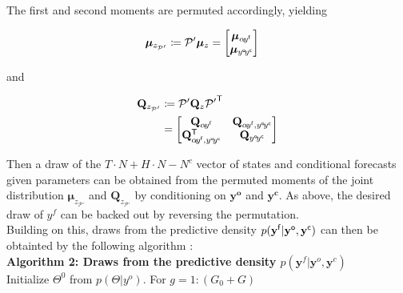 \documentclass[notitlepage,a4paper,12pt]{article}
\newcommand{\transpose}[1]{{#1}^{\sf{T}}}
\begin{document}
The first and second moments are permuted accordingly, yielding 

\begin{align*}
\boldsymbol{\mu}_{z_{\mathcal{P}'}} &\coloneqq \mathcal{P}' \boldsymbol{\mu}_z = 
\begin{bmatrix}
    \boldsymbol{\mu}_{\alpha\! y^{\sf{f}}} \\
    \boldsymbol{\mu}_{y^{\sf{o}}\!y^{\sf{c}}}
\end{bmatrix}
\end{align*}

and 

\begin{align*}
    \mathbf{Q}_{z_{\mathcal{P}'}} &\coloneqq  \mathcal{P}' \mathbf{Q}_z \transpose{\mathcal{P}'} \\
    &= 
    \begin{bmatrix}
        \mathbf{Q}_{\alpha\! y^{\sf{f}}} & \mathbf{Q}_{\alpha\! y^{\sf{f}}, y^{\sf{o}}\!y^{\sf{c}}} \\ 
        \mathbf{Q}^{\sf{T}}_{\alpha\! y^{\sf{f}}, y^{\sf{o}}\! y^{\sf{c}}} & \mathbf{Q}_{y^{\sf{o}}\!y^{\sf{c}}}
    \end{bmatrix}
\end{align*}

Then a draw of the $T\!\cdot\!N + H\!\cdot\!N - N^c$ vector of states and conditional forecasts given parameters can be obtained from the permuted moments of the joint distribution $\boldsymbol{\mu}_{z_{\mathcal{P}'}} $ and $\mathbf{Q}_{z_{\mathcal{P}'}} $ by conditioning on $\mathbf{y^{o}}$ and $\mathbf{y^c}$. As above, the desired draw of $y^f$ can be backed out by reversing the permutation.\\

Building on this, draws from the predictive density $p(\mathbf{y^{\sf{f}}}|\mathbf{y^{\sf{o}}}, \mathbf{y^{\sf{c}}})$ can then be obtainted by the following algorithm \citep[see also][Algorithm 1]{waggonerzha1999_res}:\\

\noindent\textbf{Algorithm 2: Draws from the predictive density $p(\mathbf{y}^f | \mathbf{y}^o, \mathbf{y}^c)$}\\

Initialize $\Theta^{0}$ from $p(\Theta | y^o)$. For $g=1:(G_0+G)$
\end{document}
